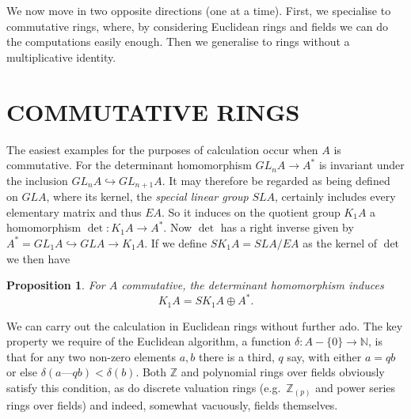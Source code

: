 \documentclass[openany,leqno]{book}  %
\newcommand{\N}{\mathbb{N}}
\newcommand{\Z}{\mathbb{Z}}
\newtheorem{prop}[theorem]{Proposition}
\begin{document}
We now move in two opposite directions (one at a time). First, we specialise to commutative rings, where, by considering Euclidean rings and fields we can do the computations easily enough. Then we generalise to rings without a multiplicative identity.

\section*{COMMUTATIVE RINGS}
The easiest examples for the purposes of calculation occur when $A$ is commutative. For the determinant homomorphism $GL_nA\longrightarrow A^*$ is invariant under the inclusion $GL_nA\hookrightarrow GL_{n+1}A$. It may therefore be regarded as being defined on $GLA$, where its kernel, the {\em special linear group} $SLA$, certainly includes every elementary matrix and thus $EA$. So it induces on the quotient group $K_1A$ a homomorphism $\det\colon  K_1A\longrightarrow A^*$. Now $\det$ has a right inverse given by $A^*=GL_1A\hookrightarrow GLA\longrightarrow K_1A$. If we define $SK_1A=SLA/EA$ as the kernel of $\det$ we then have
\begin{prop}
For $A$ commutative, the determinant homomorphism induces
\[K_1A=SK_1A\oplus A^*.\]
\end{prop}

We can carry out the calculation in Euclidean rings without further ado. The key property we require of the Euclidean algorithm, a function $\delta\colon  A-\{0\}\longrightarrow \N$, is that for any two non-zero elements $a,b$ there is a third, $q$ say, with either $a=qb$ or else $\delta(a—qb)<\delta(b)$. Both $\Z$ and polynomial rings over fields obviously satisfy this condition, as do discrete valuation rings (e.g.\  $\Z_{(p)}$ and power series rings over fields) and indeed, somewhat vacuously, fields themselves.
\end{document}
